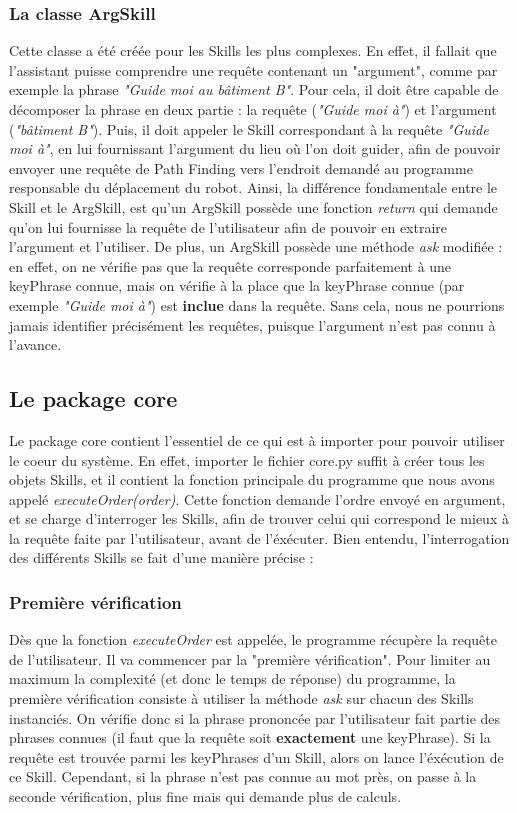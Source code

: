 \documentclass[a4paper,10pt]{report}
\begin{document}
        \subsubsection{La classe ArgSkill}
          {Cette classe a été créée pour les Skills les plus complexes. En effet, il fallait que l'assistant puisse comprendre une requête contenant un "argument", comme par exemple la phrase \textit{"Guide moi au bâtiment B"}. Pour cela, il doit être capable de décomposer la phrase en deux partie : la requête (\textit{"Guide moi à"}) et l'argument (\textit{"bâtiment B"}). Puis, il doit appeler le Skill correspondant à la requête \textit{"Guide moi à"}, en lui fournissant l'argument du lieu où l'on doit guider, afin de pouvoir envoyer une requête de Path Finding vers l'endroit demandé au programme responsable du déplacement du robot.\newline}
          {Ainsi, la différence fondamentale entre le Skill et le ArgSkill, est qu'un ArgSkill possède une fonction \textit{return} qui demande qu'on lui fournisse la requête de l'utilisateur afin de pouvoir en extraire l'argument et l'utiliser. De plus, un ArgSkill possède une méthode \textit{ask} modifiée : en effet, on ne vérifie pas que la requête corresponde parfaitement à une keyPhrase connue, mais on vérifie à la place que la keyPhrase connue (par exemple \textit{"Guide moi à"}) est \textbf{inclue} dans la requête. Sans cela, nous ne pourrions jamais identifier précisément les requêtes, puisque l'argument n'est pas connu à l'avance.}


      \subsection{Le package core}
      {Le package core contient l'essentiel de ce qui est à importer pour pouvoir utiliser le coeur du système. En effet, importer le fichier core.py suffit à créer tous les objets Skills, et il contient la fonction principale du programme que nous avons appelé \textit{executeOrder(order)}. Cette fonction demande l'ordre envoyé en argument, et se charge d'interroger les Skills, afin de trouver celui qui correspond le mieux à la requête faite par l'utilisateur, avant de l'éxécuter. Bien entendu, l'interrogation des différents Skills se fait d'une manière précise :}
        \subsubsection{Première vérification}
        {Dès que la fonction \textit{executeOrder} est appelée, le programme récupère la requête de l'utilisateur. Il va commencer par la "première vérification". Pour limiter au maximum la complexité (et donc le temps de réponse) du programme, la première vérification consiste à utiliser la méthode \textit{ask} sur chacun des Skills instanciés. On vérifie donc si la phrase prononcée par l'utilisateur fait partie des phrases connues (il faut que la requête soit \textbf{exactement} une keyPhrase).\newline}
        {Si la requête est trouvée parmi les keyPhrases d'un Skill, alors on lance l'éxécution de ce Skill. Cependant, si la phrase n'est pas connue au mot près, on passe à la seconde vérification, plus fine mais qui demande plus de calculs.}
\end{document}

